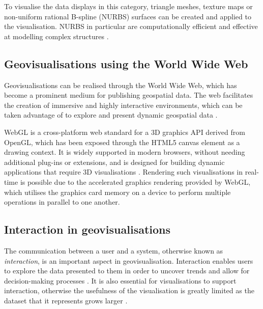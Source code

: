 \documentclass[
	fontsize=11pt
	headlines=2,
	footlines=2,
	parskip=half
]{scrartcl}
\begin{document}
{{			To visualise the data displays in this category, triangle meshes, texture maps or non-uniform rational B-spline (NURBS) surfaces can be created and applied to the visualisation. NURBS in particular are computationally efficient and effective at modelling complex structures \parencite{hildebrandt2011image, zhong2006enhanced}.

		}

		\subsection{Geovisualisations using the World Wide Web} {

			Geovisualisations can be realised through the World Wide Web, which has become a prominent medium for publishing geospatial data. The web facilitates the creation of immersive and highly interactive environments, which can be taken advantage of to explore and present dynamic geospatial data \parencite{maceachren2001research}.

			WebGL is a cross-platform web standard for a 3D graphics API derived from OpenGL, which has been exposed through the HTML5 canvas element \parencite{marrin2011webgl} as a drawing context. It is widely supported in modern browsers, without needing additional plug-ins or extensions, and is designed for building dynamic applications that require 3D visualisations \parencite{chaturvedi2015web, marrin2011webgl, parisi2012webgl}. Rendering such visualisations in real-time is possible due to the accelerated graphics rendering provided by WebGL, which utilises the graphics card memory on a device \parencite{chaturvedi2015web} to perform multiple operations in parallel to one another.

		}

		\subsection{Interaction in geovisualisations} {

			The communication between a user and a system, otherwise known as \emph{interaction}, is an important aspect in geovisualisation. Interaction enables users to explore the data presented to them in order to uncover trends and allow for decision-making processes \parencite{yi2007toward}. It is also essential for visualisations to support interaction, otherwise the usefulness of the visualisation is greatly limited as the dataset that it represents grows larger \parencite{yi2007toward}.

}}
\end{document}
